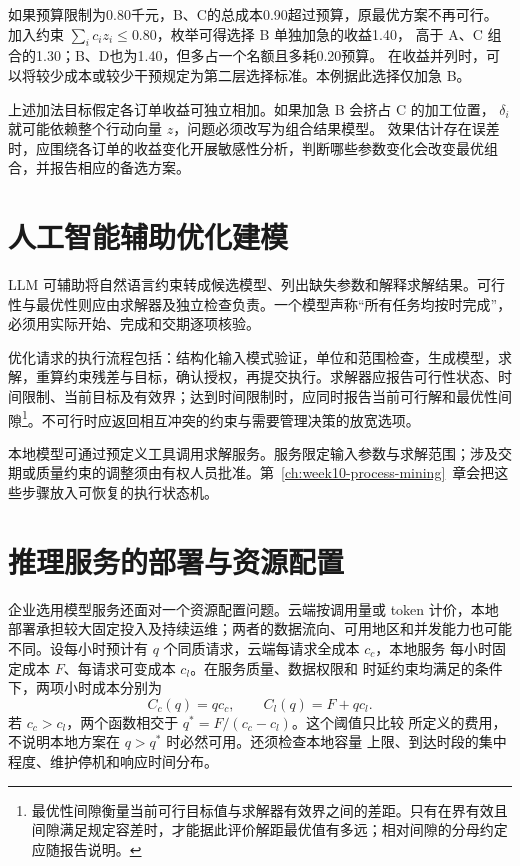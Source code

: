 如果预算限制为0.80千元，B、C的总成本0.90超过预算，原最优方案不再可行。
加入约束 \(\sum_i c_i z_i\le0.80\)，枚举可得选择 B 单独加急的收益1.40，
高于 A、C 组合的1.30；B、D也为1.40，但多占一个名额且多耗0.20预算。
在收益并列时，可以将较少成本或较少干预规定为第二层选择标准。本例据此选择仅加急 B。

上述加法目标假定各订单收益可独立相加。如果加急 B 会挤占 C 的加工位置，
\(\delta_i\) 就可能依赖整个行动向量 \(z\)，问题必须改写为组合结果模型。
效果估计存在误差时，应围绕各订单的收益变化开展敏感性分析，判断哪些参数变化会改变最优组合，并报告相应的备选方案。

\section{人工智能辅助优化建模}
LLM 可辅助将自然语言约束转成候选模型、列出缺失参数和解释求解结果。可行性与最优性则应由求解器及独立检查负责。一个模型声称“所有任务均按时完成”，必须用实际开始、完成和交期逐项核验。

优化请求的执行流程包括：结构化输入模式验证，单位和范围检查，生成模型，求解，重算约束残差与目标，确认授权，再提交执行。求解器应报告可行性状态、时间限制、当前目标及有效界；达到时间限制时，应同时报告当前可行解和最优性间隙\footnote{最优性间隙衡量当前可行目标值与求解器有效界之间的差距。只有在界有效且间隙满足规定容差时，才能据此评价解距最优值有多远；相对间隙的分母约定应随报告说明。}。不可行时应返回相互冲突的约束与需要管理决策的放宽选项。

本地模型可通过预定义工具调用求解服务。服务限定输入参数与求解范围；涉及交期或质量约束的调整须由有权人员批准。第~\ref{ch:week10-process-mining}~章会把这些步骤放入可恢复的执行状态机。

\section{推理服务的部署与资源配置}
企业选用模型服务还面对一个资源配置问题。云端按调用量或 token 计价，本地
部署承担较大固定投入及持续运维；两者的数据流向、可用地区和并发能力也可能
不同。设每小时预计有 \(q\) 个同质请求，云端每请求全成本 \(c_c\)，本地服务
每小时固定成本 \(F\)、每请求可变成本 \(c_l\)。在服务质量、数据权限和
时延约束均满足的条件下，两项小时成本分别为
\[
  C_c(q)=qc_c,\qquad C_l(q)=F+qc_l.
\]
若 \(c_c>c_l\)，两个函数相交于 \(q^*=F/(c_c-c_l)\)。这个阈值只比较
所定义的费用，不说明本地方案在 \(q>q^*\) 时必然可用。还须检查本地容量
上限、到达时段的集中程度、维护停机和响应时间分布。

